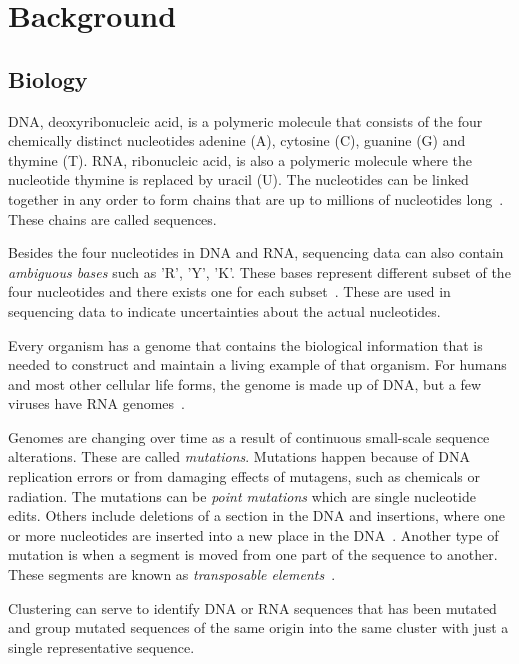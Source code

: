 \section{Background}

\subsection{Biology}
\label{sec:biology}

DNA, deoxyribonucleic acid, is a polymeric molecule that consists of the four
chemically distinct nucleotides adenine (A), cytosine (C), guanine (G) and
thymine (T). RNA, ribonucleic acid, is also a polymeric molecule where the
nucleotide thymine is replaced by uracil (U). The nucleotides can be linked
together in any order to form chains that are up to millions of nucleotides
long~\cite[pp.~8--9]{brown}. These chains are called sequences.

Besides the four nucleotides in DNA and RNA, sequencing data can also contain
\emph{ambiguous bases} such as 'R', 'Y', 'K'. These bases represent different
subset of the four nucleotides and there exists one for each
subset~\cite{tao}. These are used in sequencing data to indicate uncertainties
about the actual nucleotides.

Every organism has a genome that contains the biological information that is
needed to construct and maintain a living example of that organism. For humans
and most other cellular life forms, the genome is made up of DNA, but a few
viruses have RNA genomes~\cite[pp.~3--4]{brown}.

Genomes are changing over time as a result of continuous small-scale sequence
alterations. These are called \textit{mutations}. Mutations happen because of
DNA replication errors or from damaging effects of mutagens, such as chemicals
or radiation. The mutations can be \textit{point mutations} which are single
nucleotide edits. Others include deletions of a section in the DNA and
insertions, where one or more nucleotides are inserted into a new place in the
DNA~\cite[pp.~505--506]{brown}. Another type of mutation is when a segment is
moved from one part of the sequence to another. These segments are known as
\emph{transposable elements}~\cite{munoz}.

Clustering can serve to identify DNA or RNA sequences that has been mutated and
group mutated sequences of the same origin into the same cluster with just a
single representative sequence.